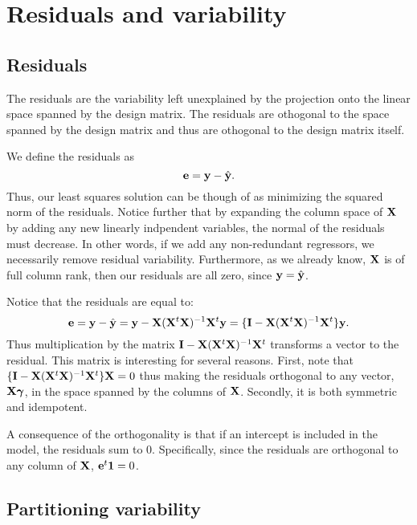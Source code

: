 \chapter{Residuals and variability}

\section{Residuals}
The residuals are the variability left unexplained by the projection 
onto the linear space spanned by the design matrix. The residuals
are othogonal to the space spanned by the design matrix and thus
are othogonal to the design matrix itself.

We define the residuals as
$$
\mathbf{e} = \mathbf{y} - \hat {\mathbf{y}}.
$$
Thus, our least squares solution can be though of as minimizing
the squared norm of the residuals. Notice further that by
expanding the column space of $\mathbf{X}$ by adding any new
linearly indpendent variables, the normal of the residuals
must decrease. In other words, if we add any non-redundant
regressors, we necessarily remove residual variability. Furthermore,
as we already know, $\mathbf{X}$ is of full column rank, then our residuals
are all zero, since $\mathbf{y} = \hat {\mathbf{y}}$. 

Notice that the residuals are equal to:
$$
\mathbf{e} = \mathbf{y} - \hat {\mathbf{y}} = \mathbf{y} - \mathbf{X} (\mathbf{X}^t \mathbf{X})^{-1} \mathbf{X}^t \mathbf{y} = \{\mathbf{I} - \mathbf{X} (\mathbf{X}^t \mathbf{X})^{-1} \mathbf{X}^t\} \mathbf{y}.
$$
Thus multiplication by the matrix $\mathbf{I} - \mathbf{X} (\mathbf{X}^t \mathbf{X})^{-1} \mathbf{X}^t$ transforms a
vector to the residual. This matrix is interesting for several reasons.
First, note that $\{\mathbf{I} - \mathbf{X} (\mathbf{X}^t \mathbf{X})^{-1} \mathbf{X}^t\} \mathbf{X} = 0$ thus making the residuals
orthogonal to any vector, $\mathbf{X} \boldsymbol{\gamma}$, in the space spanned by the
columns of $\mathbf{X}$. Secondly, it is both symmetric and idempotent. 

A consequence of the orthogonality is that if an intercept is
included in the model, the residuals sum to 0. Specifically,
since the residuals are orthogonal to any column of $\mathbf{X}$, 
$\mathbf{e}^t \mathbf{1} = 0$.

\section{Partitioning variability}

